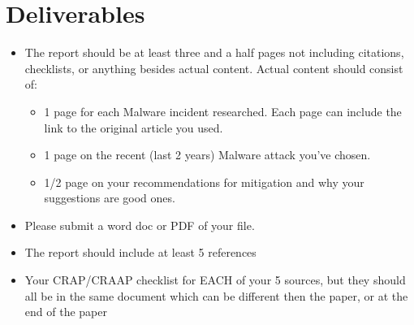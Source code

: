 \documentclass[12pt]{article}
\begin{document}
\section*{Deliverables}
\begin{itemize}
    \item The report should be at least three and a half pages not including citations, checklists, or anything besides actual content. Actual content should consist of:
        \begin{itemize}
            \item 1 page for each Malware incident researched. Each page can include the link to the original article you used.
            \item 1 page on the recent (last 2 years) Malware attack  you've chosen.
            \item 1/2 page on your recommendations for mitigation and why your suggestions are good ones.
        \end{itemize}
    \item Please submit a word doc or PDF of your file. 
    \item The report should include at least 5 references
    \item Your CRAP/CRAAP checklist for EACH of your 5 sources, but they should all be in the same document which can be different then the paper, or at the end of the paper
    
\end{itemize}
\end{document}
